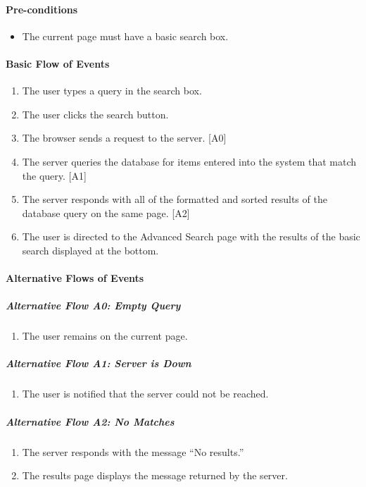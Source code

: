 \documentclass{article}
\begin{document}
\paragraph{Pre-conditions}
\begin{itemize}
\item The current page must have a basic search box.
\end{itemize}

\paragraph{Basic Flow of Events}
\begin{enumerate}
\item The user types a query in the search box.
\item The user clicks the search button.
\item The browser sends a request to the server. [A0]
\item The server queries the database for items entered into the system that match the query. [A1]
\item The server responds with all of the formatted and sorted results of the database query on the same page. [A2]
\item The user is directed to the Advanced Search page with the results of the basic search displayed at the bottom.
\end{enumerate}

\paragraph{Alternative Flows of Events}

\subparagraph{Alternative Flow A0: Empty Query}
\begin{enumerate}
\item The user remains on the current page.
\end{enumerate}

\subparagraph{Alternative Flow A1: Server is Down}
\begin{enumerate}
\item The user is notified that the server could not be reached.
\end{enumerate}

\subparagraph{Alternative Flow A2: No Matches}
\begin{enumerate}
\item The server responds with the message ``No results.''
\item The results page displays the message returned by the server.
\end{enumerate}
\end{document}
